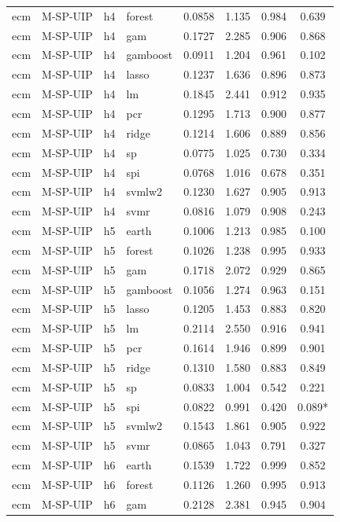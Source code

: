 \begin{ThreePartTable}
\begin{longtable}[t]{llclcccc}
ecm & M-SP-UIP & h4 & forest & 0.0858 & 1.135 & 0.984 & 0.639\\
ecm & M-SP-UIP & h4 & gam & 0.1727 & 2.285 & 0.906 & 0.868\\
ecm & M-SP-UIP & h4 & gamboost & 0.0911 & 1.204 & 0.961 & 0.102\\
ecm & M-SP-UIP & h4 & lasso & 0.1237 & 1.636 & 0.896 & 0.873\\
ecm & M-SP-UIP & h4 & lm & 0.1845 & 2.441 & 0.912 & 0.935\\
ecm & M-SP-UIP & h4 & pcr & 0.1295 & 1.713 & 0.900 & 0.877\\
ecm & M-SP-UIP & h4 & ridge & 0.1214 & 1.606 & 0.889 & 0.856\\
ecm & M-SP-UIP & h4 & sp & 0.0775 & 1.025 & 0.730 & 0.334\\
ecm & M-SP-UIP & h4 & spi & 0.0768 & 1.016 & 0.678 & 0.351\\
ecm & M-SP-UIP & h4 & svmlw2 & 0.1230 & 1.627 & 0.905 & 0.913\\
ecm & M-SP-UIP & h4 & svmr & 0.0816 & 1.079 & 0.908 & 0.243\\
\addlinespace
ecm & M-SP-UIP & h5 & earth & 0.1006 & 1.213 & 0.985 & 0.100\\
ecm & M-SP-UIP & h5 & forest & 0.1026 & 1.238 & 0.995 & 0.933\\
ecm & M-SP-UIP & h5 & gam & 0.1718 & 2.072 & 0.929 & 0.865\\
ecm & M-SP-UIP & h5 & gamboost & 0.1056 & 1.274 & 0.963 & 0.151\\
ecm & M-SP-UIP & h5 & lasso & 0.1205 & 1.453 & 0.883 & 0.820\\
ecm & M-SP-UIP & h5 & lm & 0.2114 & 2.550 & 0.916 & 0.941\\
ecm & M-SP-UIP & h5 & pcr & 0.1614 & 1.946 & 0.899 & 0.901\\
ecm & M-SP-UIP & h5 & ridge & 0.1310 & 1.580 & 0.883 & 0.849\\
ecm & M-SP-UIP & h5 & sp & 0.0833 & 1.004 & 0.542 & 0.221\\
ecm & M-SP-UIP & h5 & spi & 0.0822 & 0.991 & 0.420 & 0.089*\\
ecm & M-SP-UIP & h5 & svmlw2 & 0.1543 & 1.861 & 0.905 & 0.922\\
ecm & M-SP-UIP & h5 & svmr & 0.0865 & 1.043 & 0.791 & 0.327\\
\addlinespace
ecm & M-SP-UIP & h6 & earth & 0.1539 & 1.722 & 0.999 & 0.852\\
ecm & M-SP-UIP & h6 & forest & 0.1126 & 1.260 & 0.995 & 0.913\\
ecm & M-SP-UIP & h6 & gam & 0.2128 & 2.381 & 0.945 & 0.904\\

\end{longtable}
\end{ThreePartTable}
